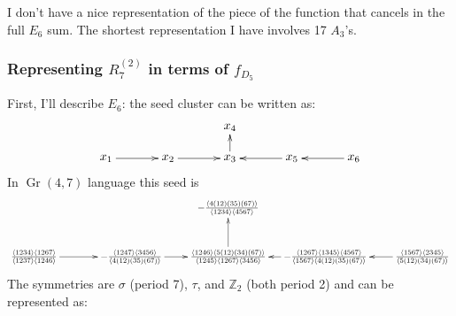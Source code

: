 \documentclass[12pt]{article}
\DeclareMathOperator{\Gr}{Gr}
\def\a{\mathcal{A}}
\def\fd5{f_{D_5}}
\def\a2{A_2}
\def\a3{A_3}
\def\e6{E_6}
\def\r27{R^{(2)}_7}
\begin{document}
I don't have a nice representation of the piece of the function that cancels in the full $\e6$ sum. The shortest representation I have involves 17 $\a3$'s. 

\subsubsection*{Representing $\r27$ in terms of $\fd5$}

First, I'll describe $\e6$: the seed cluster can be written as:
\begin{equation}
\begin{gathered}
\begin{xy} 0;<1pt,0pt>:<0pt,-1pt>::
	(0,25) *+{x_1} ="1",
	(50,25) *+{x_2} ="2",
	(100,25) *+{x_3} ="3",
	(100,0) *+{x_4} ="4",
	(150,25) *+{x_5} ="5",
	(200,25) *+{x_6} ="6",
	"1", {\ar"2"},
	"2", {\ar"3"},
	"3", {\ar"4"},
	"5", {\ar"3"},
	"6", {\ar"5"},
\end{xy}
\end{gathered}
\end{equation}
In $\Gr(4,7)$ language this seed is
\begin{equation}
\begin{gathered}
\begin{xy} 0;<1pt,0pt>:<0pt,-1pt>::
	(0,50) *+{\frac{\langle 1234\rangle  \langle 1267\rangle }{\langle
   		1237\rangle  \langle 1246\rangle }} ="1",
	(100,50) *+{-\frac{\langle 1247\rangle  \langle 3456\rangle
 	  	}{\langle 4(12)(35)(67)\rangle }} ="2",
	(200,50) *+{\frac{\langle 1246\rangle  \langle 5(12)(34)(67)\rangle
 	  	}{\langle 1245\rangle  \langle 1267\rangle  \langle
   		3456\rangle }} ="3",
	(200,0) *+{-\frac{\langle 4(12)(35)(67)\rangle }{\langle
   		1234\rangle  \langle 4567\rangle }} ="4",
	(300,50) *+{-\frac{\langle 1267\rangle  \langle 1345\rangle  \langle
   		4567\rangle }{\langle 1567\rangle  \langle
   		4(12)(35)(67)\rangle }} ="5",
	(400,50) *+{\frac{\langle 1567\rangle  \langle 2345\rangle }{\langle
   		5(12)(34)(67)\rangle }} ="6",
	"1", {\ar"2"},
	"2", {\ar"3"},
	"3", {\ar"4"},
	"5", {\ar"3"},
	"6", {\ar"5"},
\end{xy}
\end{gathered}
\end{equation}
The symmetries are $\sigma$ (period 7), $\tau$, and $\mathbb{Z}_2$ (both period 2) and can be represented as:
\end{document}
